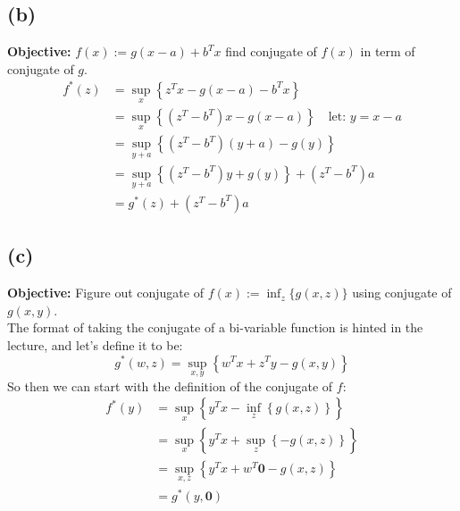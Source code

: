 \documentclass[]{article}
\begin{document}
    \subsection*{(b)}
        \textbf{Objective:} $f(x):= g(x - a) + b^Tx$ find conjugate of $f(x)$ in term of conjugate of $g$. 
        \begin{align*}\tag{2b1}\label{eqn:2b1}
            f^*(z) &= \sup_x \left\lbrace
                z^Tx - g(x - a) - b^Tx
            \right\rbrace 
            \\
            &= \sup_x \left\lbrace
                (z^T - b^T)x - g(x - a)
            \right\rbrace \quad \text{let: } y = x - a
            \\
            &= \sup_{y + a} \left\lbrace
                (z^T - b^T)(y + a) - g(y)
            \right\rbrace
            \\
            &= 
            \sup_{y + a} \left\lbrace
                (z^T - b^T)y + g(y)
            \right\rbrace + (z^T - b^T)a
            \\
            &= g^*(z) + (z^T - b^T)a
        \end{align*}
    \subsection*{(c)}
        \textbf{Objective:} Figure out conjugate of $f(x):= \inf_z \{g(x, z)\}$ using conjugate of $g(x, y)$. 
        \\
        The format of taking the conjugate of a bi-variable function is hinted in the lecture, and let's define it to be: 
        $$
            g^*(w, z) = \sup_{x, y} \left\lbrace
                w^Tx + z^Ty - g(x, y)
            \right\rbrace
        $$
        So then we can start with the definition of the conjugate of $f$: 
        \begin{align*}\tag{2c1}\label{eqn:2c1}
            f^*(y) &= \sup_x \left\lbrace
                y^Tx - \inf_z \left\lbrace
                    g(x, z)
                \right\rbrace
            \right\rbrace
            \\
            &= \sup_x \left\lbrace
                y^Tx + \sup_z \left\lbrace
                    -g(x, z)
                \right\rbrace
            \right\rbrace
            \\
            &= \sup_{x, z} \left\lbrace
                y^Tx + w^T\mathbf{0} - g(x, z)
            \right\rbrace
            \\
            &= g^*(y, \mathbf{0})
        \end{align*}
\end{document}
